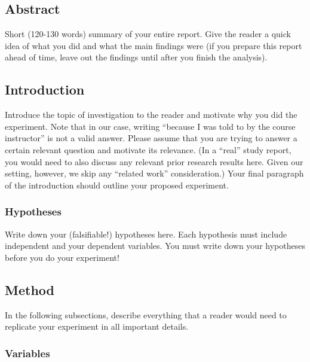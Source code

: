 \documentclass[unicode,11pt,a4paper,oneside,numbers=endperiod,openany]{scrartcl}
\begin{document}
\setassignment
{}

\newline


\subsection{Abstract}

Short (120-130 words) summary of your entire report. Give the reader a quick idea of what you did and what the main findings were (if you prepare this report ahead of time, leave out the findings until after you finish the analysis).


\subsection{Introduction}

Introduce the topic of investigation to the reader and motivate why you did the experiment. Note that in our case, writing “because I was told to by the course instructor” is not a valid answer. Please assume that you are trying to answer a certain relevant question and motivate its relevance. (In a “real” study report, you would need to also discuss any relevant prior research results here. Given our setting, however, we skip any “related work” consideration.) Your final paragraph of the introduction should outline your proposed experiment.


    \subsubsection{Hypotheses}

    Write down your (falsifiable!) hypotheses here. Each hypothesis must include independent and your dependent variables. You must write down your hypotheses before you do your experiment!

\subsection{Method}

In the following subsections, describe everything that a reader would need to replicate your experiment in all important details.


    \subsubsection{Variables}
\end{document}
